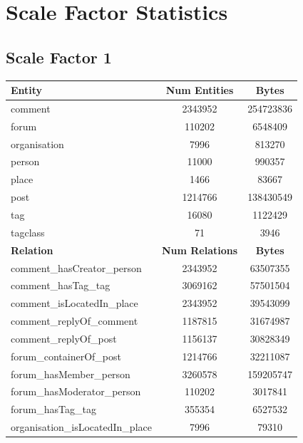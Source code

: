 \section{Scale Factor Statistics}\label{appendix:scale_factors}
\subsection{Scale Factor 1}
\begin{table}[H]
    \centering
    \begin{tabular} {| l | c | c |}
        \hline
        \textbf{Entity} & \textbf{Num Entities} & \textbf{Bytes} \\
        \hline
        \hline
        comment & 2343952 & 254723836 \\
        \hline
        forum & 110202 & 6548409 \\
        \hline
        organisation & 7996 & 813270 \\
        \hline
        person & 11000 & 990357 \\
        \hline
        place & 1466 & 83667 \\
        \hline
        post & 1214766 & 138430549 \\
        \hline
        tag & 16080 & 1122429 \\
        \hline
        tagclass & 71 & 3946 \\
        \hline
        \hline
        \textbf{Relation} & \textbf{Num Relations} & \textbf{Bytes} \\
        \hline
        \hline
        comment\_hasCreator\_person & 2343952 & 63507355 \\
        \hline
        comment\_hasTag\_tag & 3069162 & 57501504 \\
        \hline
        comment\_isLocatedIn\_place & 2343952 & 39543099 \\
        \hline
        comment\_replyOf\_comment & 1187815 & 31674987 \\
        \hline
        comment\_replyOf\_post & 1156137 & 30828349 \\
        \hline
        forum\_containerOf\_post & 1214766 & 32211087 \\
        \hline
        forum\_hasMember\_person & 3260578 & 159205747 \\
        \hline
        forum\_hasModerator\_person & 110202 & 3017841 \\
        \hline
        forum\_hasTag\_tag & 355354 & 6527532 \\
        \hline
        organisation\_isLocatedIn\_place & 7996 & 79310 \\

\end{tabular}
\end{table}
